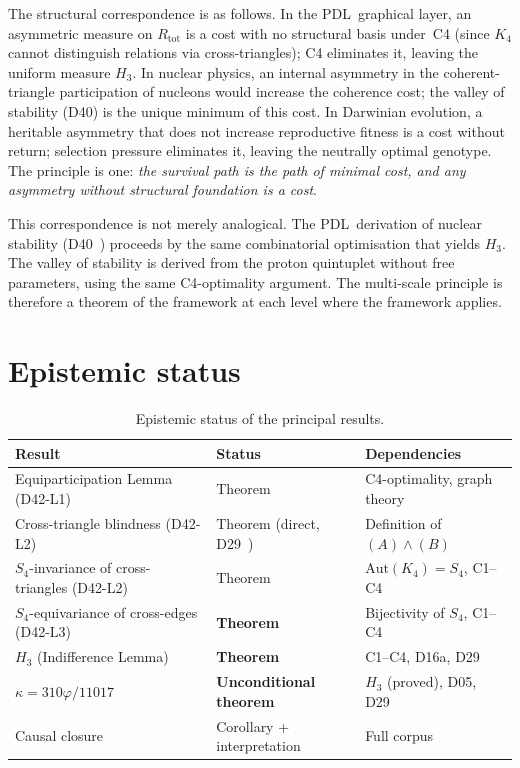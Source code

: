 \documentclass[11pt,a4paper]{article}
\theoremstyle{plain}
\theoremstyle{definition}
\theoremstyle{remark}
\newcommand{\PDL}{\textnormal{PDL}}
\newcommand{\Kfour}{K_4}
\newcommand{\Rtot}{R_{\mathrm{tot}}}
\newcommand{\vp}{\varphi}
\newcommand{\kap}{\kappa}
\begin{document}
\noindent The structural correspondence is as follows. In the \PDL\ graphical layer, an asymmetric measure on $\Rtot$ is a cost with no structural basis under~C4 (since $\Kfour$ cannot distinguish relations via cross-triangles); C4 eliminates it, leaving the uniform measure $H_3$. In nuclear physics, an internal asymmetry in the coherent-triangle participation of nucleons would increase the coherence cost; the valley of stability (D40) is the unique minimum of this cost. In Darwinian evolution, a heritable asymmetry that does not increase reproductive fitness is a cost without return; selection pressure eliminates it, leaving the neutrally optimal genotype. The principle is one: \emph{the survival path is the path of minimal cost, and any asymmetry without structural foundation is a cost}.

This correspondence is not merely analogical. The \PDL\ derivation of nuclear stability (D40~\cite{PDL_D40_2026}) proceeds by the same combinatorial optimisation that yields $H_3$. The valley of stability is derived from the proton quintuplet without free parameters, using the same C4-optimality argument. The multi-scale principle is therefore a theorem of the framework at each level where the framework applies.

\section{Epistemic status}
\label{sec:status}

\begin{table}[H]
\centering
\caption{Epistemic status of the principal results.}
\label{tab:status}
\begin{tabular}{lll}
\toprule
Result & Status & Dependencies \\
\midrule
Equiparticipation Lemma (D42-L1) & Theorem & C4-optimality, graph theory \\
Cross-triangle blindness (D42-L2) & Theorem (direct, D29~\cite{PDL_D29_2026}) & Definition of $(A)\wedge(B)$ \\
$S_4$-invariance of cross-triangles (D42-L2) & Theorem & $\mathrm{Aut}(K_4)=S_4$, C1--C4 \\
$S_4$-equivariance of cross-edges (D42-L3) & \textbf{Theorem} & Bijectivity of $S_4$, C1--C4 \\
$H_3$ (Indifference Lemma) & \textbf{Theorem} & C1--C4, D16a, D29 \\
$\kap = 310\vp/11017$ & \textbf{Unconditional theorem} & $H_3$ (proved), D05, D29 \\
Causal closure & Corollary + interpretation & Full corpus \\
\bottomrule
\end{tabular}
\end{table}
\end{document}
